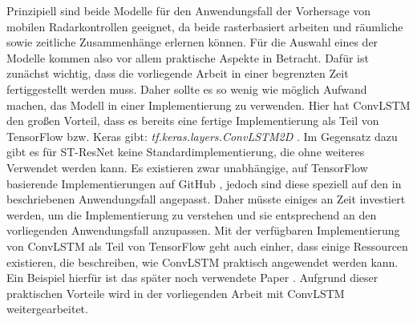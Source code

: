 Prinzipiell sind beide Modelle für den Anwendungsfall der Vorhersage von mobilen Radarkontrollen geeignet, da beide rasterbasiert arbeiten und räumliche sowie zeitliche Zusammenhänge erlernen können.
Für die Auswahl eines der Modelle kommen also vor allem praktische Aspekte in Betracht.
Dafür ist zunächst wichtig, dass die vorliegende Arbeit in einer begrenzten Zeit fertiggestellt werden muss.
Daher sollte es so wenig wie möglich Aufwand machen, das Modell in einer Implementierung zu verwenden.
Hier hat ConvLSTM den großen Vorteil, dass es bereits eine fertige Implementierung als Teil von TensorFlow bzw. Keras gibt: \emph{tf.keras.layers.ConvLSTM2D} \cite{DocConvLSTM2D}.
Im Gegensatz dazu gibt es für ST-ResNet keine Standardimplementierung, die ohne weiteres Verwendet werden kann.
Es existieren zwar unabhängige, auf TensorFlow basierende Implementierungen auf GitHub \cite{STResNetImpl, STResNetImpl2}, jedoch sind diese speziell auf den in \cite{STResNetOriginal} beschriebenen Anwendungsfall angepasst.
Daher müsste einiges an Zeit investiert werden, um die Implementierung zu verstehen und sie entsprechend an den vorliegenden Anwendungsfall anzupassen.
Mit der verfügbaren Implementierung von ConvLSTM als Teil von TensorFlow geht auch einher, dass einige Ressourcen existieren, die beschreiben, wie ConvLSTM praktisch angewendet werden kann.
Ein Beispiel hierfür ist das später noch verwendete Paper \cite{CrimeConvLSTM}.
Aufgrund dieser praktischen Vorteile wird in der vorliegenden Arbeit mit ConvLSTM weitergearbeitet.
